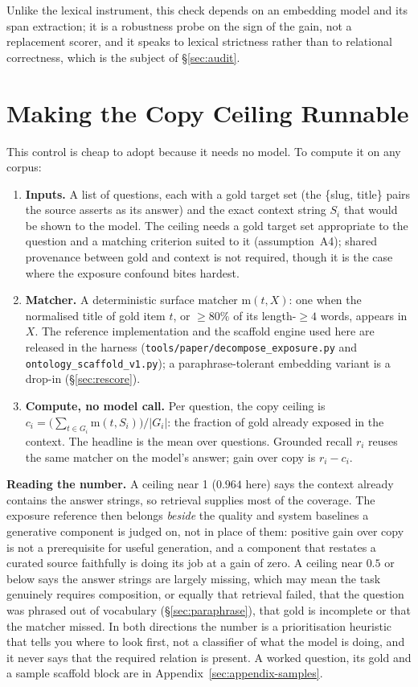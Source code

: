 \documentclass[10pt,twocolumn]{article}
\begin{document}
Unlike the lexical instrument, this check depends on an embedding model and its span extraction; it
is a robustness probe on the sign of the gain, not a replacement scorer, and it speaks to lexical
strictness rather than to relational correctness, which is the subject of \S\ref{sec:audit}.

\section{Making the Copy Ceiling Runnable}\label{sec:runnable}
This control is cheap to adopt because it needs no model. To compute it on any corpus:
\begin{enumerate}[topsep=2pt,itemsep=1pt,leftmargin=1.6em]
\item \textbf{Inputs.} A list of questions, each with a gold target set (the \{slug, title\} pairs the source asserts as its answer) and the exact context string $S_i$ that would be shown to the model. The ceiling needs a gold target set appropriate to the question and a matching criterion suited to it (assumption~A4); shared provenance between gold and context is not required, though it is the case where the exposure confound bites hardest.
\item \textbf{Matcher.} A deterministic surface matcher $\mathrm{m}(t,X)$: one when the normalised title of gold item $t$, or $\geq80\%$ of its length-$\geq4$ words, appears in $X$. The reference implementation and the scaffold engine used here are released in the harness (\texttt{tools/paper/decompose\_exposure.py} and \texttt{ontology\_scaffold\_v1.py}); a paraphrase-tolerant embedding variant is a drop-in (\S\ref{sec:rescore}).
\item \textbf{Compute, no model call.} Per question, the copy ceiling is $c_i=\bigl(\sum_{t\in G_i}\mathrm{m}(t,S_i)\bigr)/|G_i|$: the fraction of gold already exposed in the context. The headline is the mean over questions. Grounded recall $r_i$ reuses the same matcher on the model's answer; gain over copy is $r_i-c_i$.
\end{enumerate}
\textbf{Reading the number.} A ceiling near 1 ($0.964$ here) says the context already contains the answer strings, so retrieval supplies most of the coverage. The exposure reference then belongs \emph{beside} the quality and system baselines a generative component is judged on, not in place of them: positive gain over copy is not a prerequisite for useful generation, and a component that restates a curated source faithfully is doing its job at a gain of zero. A ceiling near $0.5$ or below says the answer strings are largely missing, which may mean the task genuinely requires composition, or equally that retrieval failed, that the question was phrased out of vocabulary (\S\ref{sec:paraphrase}), that gold is incomplete or that the matcher missed. In both directions the number is a prioritisation heuristic that tells you where to look first, not a classifier of what the model is doing, and it never says that the required relation is present. A worked question, its gold and a sample scaffold block are in Appendix~\ref{sec:appendix-samples}.
\end{document}
